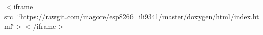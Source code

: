 $<$iframe src=\char`\"{}https\-://rawgit.\-com/magore/esp8266\-\_\-ili9341/master/doxygen/html/index.\-html\char`\"{}$>$$<$/iframe$>$ 